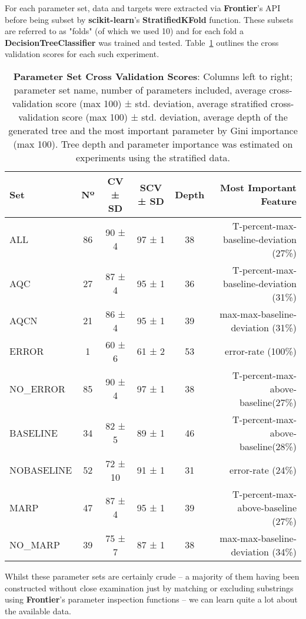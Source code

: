 For each parameter set, data and targets were extracted via \textbf{Frontier}'s
API before being subset by \textbf{scikit-learn}'s \textbf{StratifiedKFold}
function. These subsets are referred to as "folds" (of which we used 10) and for
each fold a \textbf{DecisionTreeClassifier} was trained and tested.
Table~\ref{tab:pset-cv} outlines the cross validation scores for each such
experiment.

\begin{table}
    \centering
    \begin{tabular}{l | c  c  c  c  r}
        Set           & Nº & CV ± SD & SCV ± SD & Depth & Most Important Feature\\
        \hline
        ALL           & 86 & 90 ± 4 & 97 ± 1 & 38 & T-percent-max-baseline-deviation (27\%)\\
        AQC           & 27 & 87 ± 4 & 95 ± 1 & 36 & T-percent-max-baseline-deviation (31\%)\\
        AQCN          & 21 & 86 ± 4 & 95 ± 1 & 39 & max-max-baseline-deviation (31\%)\\
        ERROR         & 1  & 60 ± 6 & 61 ± 2 & 53 & error-rate (100\%)\\
        NO\_ERROR     & 85 & 90 ± 4 & 97 ± 1 & 38 & T-percent-max-above-baseline(27\%)\\
        BASELINE      & 34 & 82 ± 5 & 89 ± 1 & 46 & T-percent-max-above-baseline(28\%)\\
        NOBASELINE    & 52 & 72 ± 10 & 91 ± 1 & 31 & error-rate (24\%)\\
        MARP          & 47 & 87 ± 4 & 95 ± 1 & 39 & T-percent-max-above-baseline (27\%)\\
        NO\_MARP      & 39 & 75 ± 7 & 87 ± 1 & 38 & max-max-baseline-deviation (34\%)\\
    \end{tabular}
    \caption[pset-cv]{\textbf{Parameter Set Cross Validation Scores}: Columns
        left to right; parameter set name, number of parameters included,
        average cross-validation score (max 100) ± std. deviation,
        average stratified cross-validation score (max 100) ± std. deviation,
        average depth of the generated tree and the most important parameter by
        Gini importance (max 100). Tree depth and parameter importance was
        estimated on experiments using the stratified data.}
    \label{tab:pset-cv}
\end{table}

Whilst these parameter sets are certainly crude -- a majority of them having
been constructed without close examination just by matching or excluding
substrings using \textbf{Frontier}'s parameter inspection functions -- we can
learn quite a lot about the available data.

